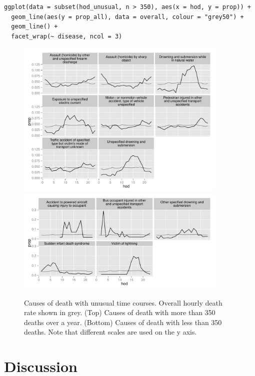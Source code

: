 \documentclass[article]{jss}
\begin{document}
\begin{Verbatim}
ggplot(data = subset(hod_unusual, n > 350), aes(x = hod, y = prop)) + 
  geom_line(aes(y = prop_all), data = overall, colour = "grey50") +
  geom_line() + 
  facet_wrap(~ disease, ncol = 3)
\end{Verbatim}

\begin{figure}[htbp]
  \centering
    \includegraphics[width=0.9\textwidth]{case-study/unusual-big}
    \includegraphics[width=0.9\textwidth]{case-study/unusual-sml}
  \caption{Causes of death with unusual time courses. Overall hourly death rate shown in grey. (Top) Causes of death with more than 350 deaths over a year. (Bottom) Causes of death with less than 350 deaths.  Note that different scales are used on the y axis.}
  \label{fig:disease}
\end{figure}

\section{Discussion}
\label{sec:discussion}
\end{document}
